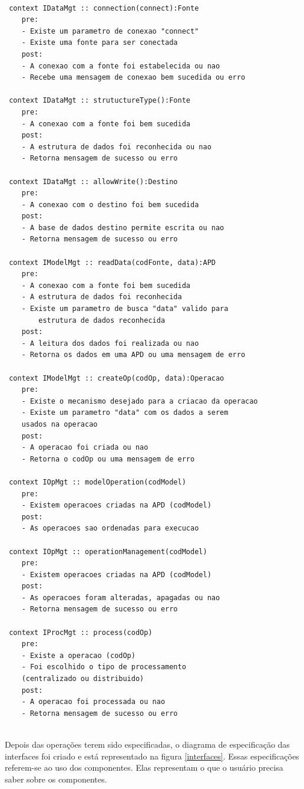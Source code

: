 \begin{lstlisting}[frame=single, language=Oberon-2, basicstyle=\small]

 context IDataMgt :: connection(connect):Fonte
	pre:
	- Existe um parametro de conexao "connect"
	- Existe uma fonte para ser conectada
	post:
	- A conexao com a fonte foi estabelecida ou nao
	- Recebe uma mensagem de conexao bem sucedida ou erro

 context IDataMgt :: strutuctureType():Fonte
	pre:
	- A conexao com a fonte foi bem sucedida
	post:
	- A estrutura de dados foi reconhecida ou nao
	- Retorna mensagem de sucesso ou erro
		
 context IDataMgt :: allowWrite():Destino
	pre:
	- A conexao com o destino foi bem sucedida
	post:
	- A base de dados destino permite escrita ou nao
	- Retorna mensagem de sucesso ou erro
	
 context IModelMgt :: readData(codFonte, data):APD
	pre:
	- A conexao com a fonte foi bem sucedida
	- A estrutura de dados foi reconhecida
	- Existe um parametro de busca "data" valido para 
		estrutura de dados reconhecida
	post:
	- A leitura dos dados foi realizada ou nao
	- Retorna os dados em uma APD ou uma mensagem de erro
		
 context IModelMgt :: createOp(codOp, data):Operacao
	pre:
	- Existe o mecanismo desejado para a criacao da operacao
	- Existe um parametro "data" com os dados a serem 
	usados na operacao
	post:
	- A operacao foi criada ou nao
	- Retorna o codOp ou uma mensagem de erro
		
 context IOpMgt :: modelOperation(codModel)
	pre:
	- Existem operacoes criadas na APD (codModel)
	post:
	- As operacoes sao ordenadas para execucao
		
 context IOpMgt :: operationManagement(codModel)
	pre:
	- Existem operacoes criadas na APD (codModel)
	post:
	- As operacoes foram alteradas, apagadas ou nao
	- Retorna mensagem de sucesso ou erro
	
 context IProcMgt :: process(codOp)
	pre:
	- Existe a operacao (codOp)
	- Foi escolhido o tipo de processamento 
	(centralizado ou distribuido)
	post:
	- A operacao foi processada ou nao
	- Retorna mensagem de sucesso ou erro
		
\end{lstlisting}

Depois das operações terem sido especificadas, o diagrama de especificação das interfaces foi criado e está representado na figura \ref{interfaces}. Essas especificações referem-se ao uso dos componentes. Elas representam o que o usuário precisa saber sobre os componentes.

